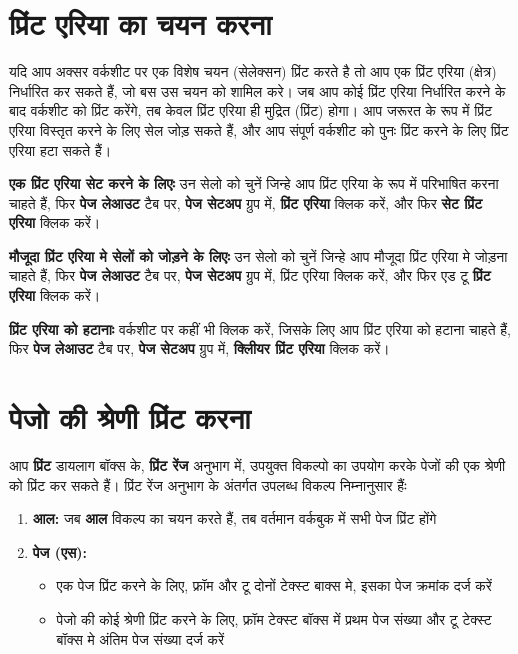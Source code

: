 \section{प्रिंट एरिया का चयन करना}\label{id-1.26}

यदि आप अक्सर वर्कशीट पर एक विशेष चयन (सेलेक्सन) प्रिंट करते है तो आप एक प्रिंट एरिया (क्षेत्र) निर्धारित कर सकते हैं, जो बस उस चयन को शामिल करे। जब आप कोई प्रिंट एरिया निर्धारित करने के बाद वर्कशीट को प्रिंट करेंगे, तब केवल प्रिंट एरिया ही मुद्रित (प्रिंट) होगा। आप जरूरत के रूप में प्रिंट एरिया विस्तृत करने के लिए सेल जोड़ सकते हैं, और आप संपूर्ण वर्कशीट को पुनः प्रिंट करने के लिए प्रिंट एरिया हटा सकते हैं।

\textbf{एक प्रिंट एरिया सेट करने के लिएः} उन सेलो को चुनें जिन्हे आप प्रिंट एरिया के रूप में परिभाषित करना चाहते हैं, फिर \textbf{पेज लेआउट} टैब पर, \textbf{पेज सेटअप} ग्रुप में, \textbf{प्रिंट एरिया} क्लिक करें, और फिर \textbf{सेट प्रिंट एरिया} क्लिक करें।

\textbf{मौजूदा प्रिंट एरिया मे सेलों को जोड़ने के लिएः} उन सेलो को चुनें जिन्हे आप मौजूदा प्रिंट एरिया मे जोड़ना चाहते हैं, फिर \textbf{पेज लेआउट} टैब पर, \textbf{पेज सेटअप} ग्रुप में, प्रिंट एरिया क्लिक करें, और फिर एड टू \textbf{प्रिंट एरिया} क्लिक करें।

\textbf{प्रिंट एरिया को हटानाः} वर्कशीट पर कहीं भी क्लिक करें, जिसके लिए आप प्रिंट एरिया को हटाना चाहते हैं, फिर \textbf{पेज लेआउट} टैब पर, \textbf{पेज सेटअप} ग्रुप में, \textbf{क्लिीयर प्रिंट एरिया} क्लिक करें।

\section{पेजो की श्रेणी प्रिंट करना}\label{id-1.27}

आप \textbf{प्रिंट} डायलाग बॉक्स के, \textbf{प्रिंट रेंज} अनुभाग में, उपयुक्त विकल्पो का उपयोग करके पेजों की एक श्रेणी को प्रिंट कर सकते हैं। प्रिंट रेंज अनुभाग के अंतर्गत उपलब्ध विकल्प निम्नानुसार हैंः

\begin{enumerate}
\item \textbf{आल:} जब \textbf{आल} विकल्प का चयन करते हैं, तब वर्तमान वर्कबुक में सभी पेज प्रिंट होंगे
\item \textbf{पेज (एस):}
		\begin{itemize}
		\item एक पेज प्रिंट करने के लिए, फ्रॉम और टू दोनों टेक्स्ट बाक्स मे, इसका पेज क्रमांक दर्ज करें
		\item पेजो की कोई श्रेणी प्रिंट करने के लिए, फ्रॉम टेक्स्ट बॉक्स में प्रथम पेज संख्या और टू टेक्स्ट बॉक्स मे अंतिम पेज संख्या दर्ज करें
		\end{itemize}
\end{enumerate}
					
